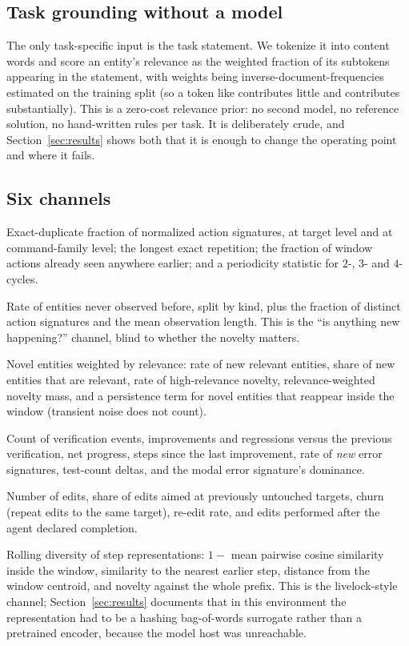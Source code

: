 \subsection{Task grounding without a model}
The only task-specific input is the task statement. We tokenize it into content words and score an
entity's relevance as the weighted fraction of its subtokens appearing in the statement, with weights
being inverse-document-frequencies estimated on the training split (so a token like 
contributes little and  contributes substantially). This is a zero-cost relevance prior:
no second model, no reference solution, no hand-written rules per task. It is deliberately crude, and
Section~\ref{sec:results} shows both that it is enough to change the operating point and where it fails.

\subsection{Six channels}
\begin{description}[leftmargin=1.1em,style=nextline,itemsep=2pt]
\item[\rep{} --- repetition.] Exact-duplicate fraction of normalized action signatures, at target level
and at command-family level; the longest exact repetition; the fraction of window actions already seen
anywhere earlier; and a periodicity statistic for $2$-, $3$- and $4$-cycles.
\item[\nov{} --- relevance-blind novelty.] Rate of entities never observed before, split by kind, plus
the fraction of distinct action signatures and the mean observation length. This is the ``is anything
new happening?'' channel, blind to whether the novelty matters.
\item[\evid{} --- task-grounded evidence.] Novel entities weighted by relevance: rate of new relevant
entities, share of new entities that are relevant, rate of high-relevance novelty, relevance-weighted
novelty mass, and a persistence term for novel entities that reappear inside the window (transient noise
does not count).
\item[\ver{} --- verification deltas.] Count of verification events, improvements and regressions versus
the previous verification, net progress, steps since the last improvement, rate of \emph{new} error
signatures, test-count deltas, and the modal error signature's dominance.
\item[\work{} --- workspace dynamics.] Number of edits, share of edits aimed at previously untouched
targets, churn (repeat edits to the same target), re-edit rate, and edits performed after the agent
declared completion.
\item[\sem{} --- semantic redundancy.] Rolling diversity of step representations: $1-$ mean pairwise
cosine similarity inside the window, similarity to the nearest earlier step, distance from the window
centroid, and novelty against the whole prefix. This is the livelock-style channel;
Section~\ref{sec:results} documents that in this environment the representation had to be a hashing
bag-of-words surrogate rather than a pretrained encoder, because the model host was unreachable.
\end{description}

